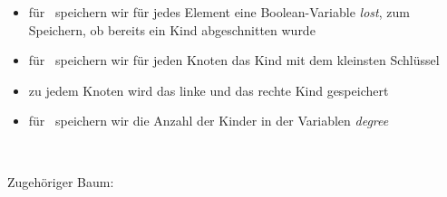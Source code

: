 \begin{itemize}
	\item für \decKey~speichern wir für jedes Element eine Boolean-Variable \textit{lost}, zum Speichern, ob bereits ein Kind abgeschnitten wurde
	\item für \exMin~speichern wir für jeden Knoten das Kind mit dem kleinsten Schlüssel
	\item zu jedem Knoten wird das linke und das rechte Kind gespeichert
	\item für \cons~speichern wir die Anzahl der Kinder in der Variablen \textit{degree}
\end{itemize}
\topbreak\ \\\up\up
\begin{minipage}{0.25\textwidth}
	
\end{minipage}
\begin{minipage}{0.7\textwidth}
	Zugehöriger Baum:\\\up\up
	
\end{minipage}\\\ \\\ \\\ \\